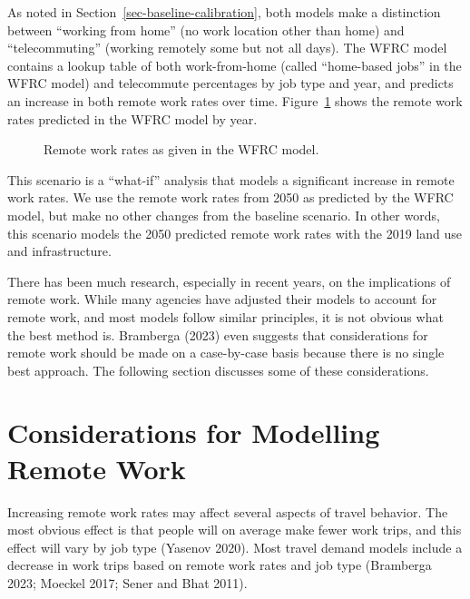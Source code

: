 \documentclass[fancy, twoside, mastersfancy, ms]{byuthesis}
\begin{document}
As noted in Section~\ref{sec-baseline-calibration}, both models make a
distinction between ``working from home'' (no work location other than
home) and ``telecommuting'' (working remotely some but not all days).
The WFRC model contains a lookup table of both work-from-home (called
``home-based jobs'' in the WFRC model) and telecommute percentages by
job type and year, and predicts an increase in both remote work rates
over time. Figure~\ref{fig-wfrc-remote-work-rate-plot} shows the remote
work rates predicted in the WFRC model by year.

\begin{figure}


\caption{\label{fig-wfrc-remote-work-rate-plot}Remote work rates as
given in the WFRC model.}

\end{figure}%

This scenario is a ``what-if'' analysis that models a significant
increase in remote work rates. We use the remote work rates from 2050 as
predicted by the WFRC model, but make no other changes from the baseline
scenario. In other words, this scenario models the 2050 predicted remote
work rates with the 2019 land use and infrastructure.

There has been much research, especially in recent years, on the
implications of remote work. While many agencies have adjusted their
models to account for remote work, and most models follow similar
principles, it is not obvious what the best method is. Bramberga (2023)
even suggests that considerations for remote work should be made on a
case-by-case basis because there is no single best approach. The
following section discusses some of these considerations.

\section{Considerations for Modelling Remote
Work}\label{sec-remote-work-considerations}

Increasing remote work rates may affect several aspects of travel
behavior. The most obvious effect is that people will on average make
fewer work trips, and this effect will vary by job type (Yasenov 2020).
Most travel demand models include a decrease in work trips based on
remote work rates and job type (Bramberga 2023; Moeckel 2017; Sener and
Bhat 2011).
\end{document}
